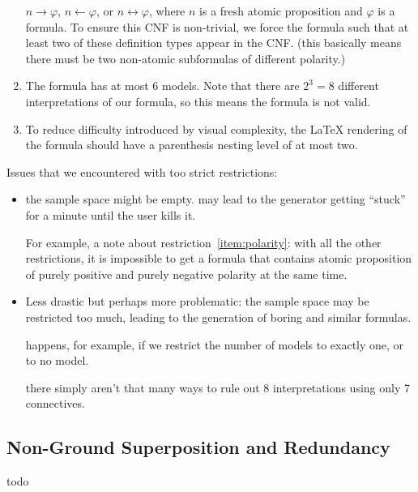 \begin{enumerate}
        $n \rightarrow \varphi$,
        $n \leftarrow \varphi$, or
        $n \leftrightarrow \varphi$,
        where $n$ is a fresh atomic proposition and $\varphi$ is a formula.
        To ensure this CNF is non-trivial,
        we force the formula such that at least two of these definition types appear in the CNF.
        (this basically means there must be two non-atomic subformulas of different polarity.)
    \item
        The formula has at most $6$ models.
        Note that there are $2^3 = 8$ different interpretations of our formula,
        so this means the formula is not valid.
    \item
        To reduce difficulty introduced by visual complexity,
        the \LaTeX{} rendering of the formula should have a parenthesis nesting level of at most two.
\end{enumerate}

Issues that we encountered with too strict restrictions:
\begin{itemize}
    \item
        the sample space might be empty.
        may lead to the generator getting ``stuck'' for a minute until the user kills it.

        For example, a note about restriction~\ref{item:polarity}:
        with all the other restrictions,
        it is impossible to get a formula that contains atomic proposition
        of purely positive and purely negative polarity at the same time.

    \item
        Less drastic but perhaps more problematic:
        the sample space may be restricted too much,
        leading to the generation of boring and similar formulas.

        happens, for example, if we restrict the number of models to exactly one,
        or to no model.

        there simply aren't that many ways to rule out 8 interpretations
        using only 7 connectives.
\end{itemize}







\subsection{Non-Ground Superposition and Redundancy}

todo


